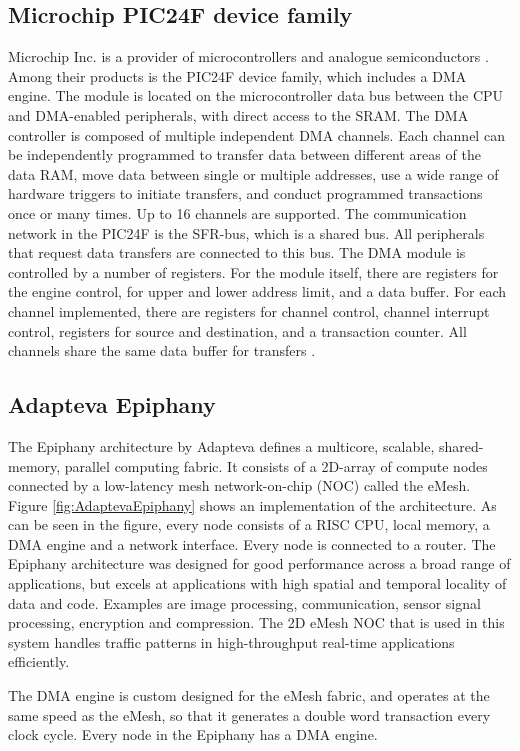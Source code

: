 \subsection{Microchip PIC24F device family}
Microchip Inc. is a provider of microcontrollers and analogue semiconductors \cite{microchip1}.
Among their products is the PIC24F device family, which includes a DMA engine.
The module is located on the microcontroller data bus between the CPU and DMA-enabled peripherals, with direct access to the SRAM.
The DMA controller is composed of multiple independent DMA channels.
Each channel can be independently programmed to transfer data between different areas of the data RAM, move data between single or multiple addresses, use a wide range of hardware triggers to initiate transfers, and conduct programmed transactions once or many times. 
Up to 16 channels are supported.
The communication network in the PIC24F is the SFR-bus, which is a shared bus.
All peripherals that request data transfers are connected to this bus.
The DMA module is controlled by a number of registers.
For the module itself, there are registers for the engine control, for upper and lower address limit, and a data buffer.
For each channel implemented, there are registers for channel control, channel interrupt control, registers for source and destination, and a transaction counter. 
All channels share the same data buffer for transfers \cite{microchip54}.

\subsection{Adapteva Epiphany}
The Epiphany architecture by Adapteva defines a multicore, scalable, shared-memory, parallel computing fabric.
It consists of a 2D-array of compute nodes connected by a low-latency mesh network-on-chip (NOC) called the eMesh.
Figure \ref{fig:AdaptevaEpiphany} shows an implementation of the architecture.
As can be seen in the figure, every node consists of a RISC CPU, local memory, a DMA engine and a network interface.
Every node is connected to a router.
The Epiphany architecture was designed for good performance across a broad range of applications, but excels at applications with high spatial and temporal locality of data and code.
Examples are image processing, communication, sensor signal processing, encryption and compression.
The 2D eMesh NOC that is used in this system handles traffic patterns in high-throughput real-time applications efficiently.

The DMA engine is custom designed for the eMesh fabric, and operates at the same speed as the eMesh, so that it generates a double word transaction every clock cycle.
Every node in the Epiphany has a DMA engine.

